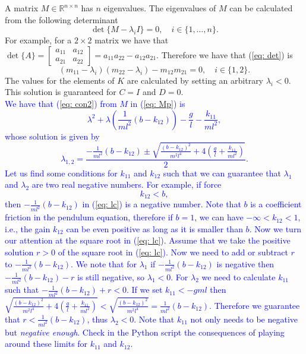 A matrix $M\in\mathbb{R}^{n\times n}$ has $n$ eigenvalues. The eigenvalues of $M$ can be calculated from the following determinant
\begin{equation}
	\operatorname{det}\{M - \lambda_{i} I\} = 0, \quad i\in\{1,\dots,n\}. \label{eq: det}
\end{equation}
For example, for a $2 \times 2$ matrix we have that $\operatorname{det}\{A\} = \begin{bmatrix}a_{11} & a_{12} \\ a_{21} & a_{22}\end{bmatrix} = a_{11}a_{22} - a_{12}a_{21}$. Therefore we have that (\ref{eq: det}) is
\begin{equation}
	(m_{11} - \lambda_i) (m_{22} - \lambda_i) - m_{12}m_{21} = 0, \quad  i\in\{1,2\}. \label{eq: con2}
\end{equation}
The values for the elements of $K$ are calculated by setting an arbitrary $\lambda_i < 0$. This solution is guaranteed for $C = I$ and $D = 0$. \\
\textcolor{blue}{
	We have that (\ref{eq: con2}) from $M$ in (\ref{eq: Mp}) is
\begin{equation}
	\lambda^2 + \lambda\left(\frac{1}{ml^2}(b-k_{12})\right) - \frac{g}{l}-\frac{k_{11}}{ml^2}, \nonumber
\end{equation}
whose solution is given by
\begin{equation}
	\lambda_{1,2} = \frac{-\frac{1}{ml^2}(b-k_{12}) \pm \sqrt{\frac{(b-k_{12})^2}{m^2l^4}+4(\frac{g}{l}+\frac{k_{11}}{ml^2})}}{2}. \label{eq: lc}
\end{equation}
Let us find some conditions for $k_{11}$ and $k_{12}$ such that we can guarantee that $\lambda_1$ and $\lambda_2$ are two real negative numbers. For example, if force
\begin{equation}
	k_{12} < b,
\end{equation}
then $-\frac{1}{ml^2}(b-k_{12})$ in (\ref{eq: lc}) is a negative number. Note that $b$ is a coefficient friction in the pendulum equation, therefore if $b = 1$, we can have $-\infty < k_{12} < 1$, i.e., the gain $k_{12}$ can be even positive as long as it is smaller than $b$. Now we turn our attention at the square root in (\ref{eq: lc}). Assume that we take the positive solution $r>0$ of the square root in (\ref{eq: lc}). Now we need to add or subtract $r$ to $-\frac{1}{ml^2}(b-k_{12})$. We note that for $\lambda_1$ if $-\frac{1}{ml^2}(b-k_{12})$ is negative then $-\frac{1}{ml^2}(b-k_{12})- r$ is still negative, so $\lambda_1 < 0$. For $\lambda_2$ we need to calculate $k_{11}$ such that  $-\frac{1}{ml^2}(b-k_{12}) + r < 0$. If we set $k_{11} < -gml$ then $\sqrt{\frac{(b-k_{12})^2}{m^2l^4}+4(\frac{g}{l}+\frac{k_{11}}{ml^2})} < \sqrt{\frac{(b-k_{12})^2}{m^2l^4}} = \frac{1}{ml^2}(b-k_{12})$. Therefore we guarantee that $r < \frac{1}{ml^2}(b-k_{12})$, thus $\lambda_2 < 0$. Note that $k_{11}$ not only needs to be negative but \emph{negative enough}. Check in the Python script the consequences of playing around these limits for $k_{11}$ and $k_{12}$.
}

